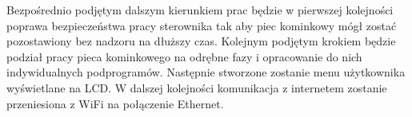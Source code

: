 \documentclass[11pt]{report}
\begin{document}
Bezpośrednio podjętym dalszym kierunkiem prac będzie w pierwszej kolejności poprawa bezpieczeństwa pracy sterownika tak aby piec kominkowy mógł zostać pozostawiony bez nadzoru na dłuższy czas.
Kolejnym podjętym krokiem będzie podział pracy pieca kominkowego na odrębne fazy i opracowanie do nich indywidualnych podprogramów. Następnie stworzone zostanie menu użytkownika wyświetlane na LCD.
W dalszej kolejności komunikacja z internetem zostanie przeniesiona z WiFi na połączenie Ethernet.


 
 
 \printbibliography[title={Książki},type=book]
 
 \printbibliography[title={Artykuły},type=article]
 
 \printbibliography[title={Prace dyplomowe}, type=thesis]
 
 \printbibliography[title={Materiały konferencyjne},type=inproceedings]
 
 \printbibliography[title={Pozostałe źródła}, nottype=article, nottype=book, nottype=inproceedings, nottype=thesis]

 
\end{document}
